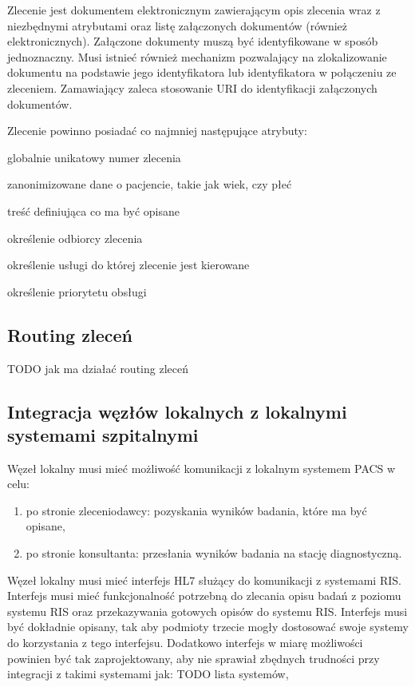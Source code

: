 \documentclass[a4paper]{article}
\begin{document}
Zlecenie jest dokumentem elektronicznym zawierającym opis zlecenia wraz z niezbędnymi atrybutami oraz listę załączonych dokumentów (również elektronicznych). Załączone dokumenty muszą być identyfikowane w sposób jednoznaczny. Musi istnieć również mechanizm pozwalający na zlokalizowanie dokumentu na podstawie jego identyfikatora lub identyfikatora w połączeniu ze zleceniem. Zamawiający zaleca stosowanie URI do identyfikacji załączonych dokumentów.

Zlecenie powinno posiadać co najmniej następujące atrybuty:
\begin{enumerate*}
\item globalnie unikatowy numer zlecenia
\item zanonimizowane dane o pacjencie, takie jak wiek, czy płeć
\item treść definiująca co ma być opisane
\item określenie odbiorcy zlecenia
\item określenie usługi do której zlecenie jest kierowane
\item określenie priorytetu obsługi
\end{enumerate*}

\subsection{Routing zleceń}

TODO jak ma działać routing zleceń

\subsection{Integracja węzłów lokalnych z lokalnymi systemami szpitalnymi}

Węzeł lokalny musi mieć możliwość komunikacji z lokalnym systemem PACS w celu:
\begin{enumerate}
 \item po stronie zleceniodawcy: pozyskania wyników badania, które ma być opisane,
 \item po stronie konsultanta: przesłania wyników badania na stację diagnostyczną.
\end{enumerate}

Węzeł lokalny musi mieć interfejs HL7 służący do komunikacji z systemami RIS. Interfejs musi mieć funkcjonalność potrzebną do zlecania opisu badań z poziomu systemu RIS oraz przekazywania gotowych opisów do systemu RIS. Interfejs musi być dokładnie opisany, tak aby podmioty trzecie mogły dostosować swoje systemy do korzystania z tego interfejsu. Dodatkowo interfejs w miarę możliwości powinien być tak zaprojektowany, aby nie sprawiał zbędnych trudności przy integracji z takimi systemami jak: TODO lista systemów, 
\end{document}
